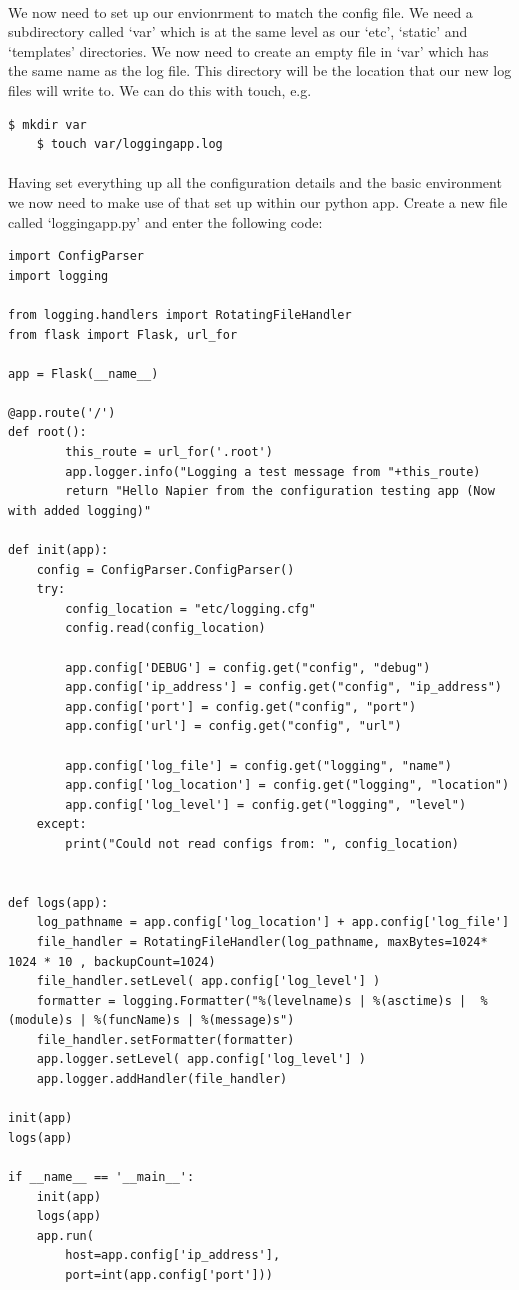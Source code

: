 \documentclass[12pt, a4paper, oneside]{book}
\begin{document}
\paragraph{} We now need to set up our envionrment to match the config file. We need a subdirectory called `var' which is at the same level as our `etc', `static' and `templates' directories. We now need to create an empty file in `var' which has the same name as the log file. This directory will be the location that our new log files will write to. We can do this with touch, e.g.

\begin{lstlisting}[style=DOS]
    $ mkdir var
    $ touch var/loggingapp.log
\end{lstlisting}

\paragraph{} Having set everything up all the configuration details and the basic environment we now need to make use of that set up within our python app. Create a new file called `loggingapp.py' and enter the following code:
\begin{lstlisting}
import ConfigParser
import logging

from logging.handlers import RotatingFileHandler
from flask import Flask, url_for

app = Flask(__name__)

@app.route('/')
def root():
        this_route = url_for('.root')
        app.logger.info("Logging a test message from "+this_route)
        return "Hello Napier from the configuration testing app (Now with added logging)" 

def init(app):
    config = ConfigParser.ConfigParser()
    try:
        config_location = "etc/logging.cfg"
        config.read(config_location)
        
        app.config['DEBUG'] = config.get("config", "debug")
        app.config['ip_address'] = config.get("config", "ip_address")
        app.config['port'] = config.get("config", "port")
        app.config['url'] = config.get("config", "url")

        app.config['log_file'] = config.get("logging", "name")
        app.config['log_location'] = config.get("logging", "location")
        app.config['log_level'] = config.get("logging", "level")
    except:
        print("Could not read configs from: ", config_location)


def logs(app):
    log_pathname = app.config['log_location'] + app.config['log_file']
    file_handler = RotatingFileHandler(log_pathname, maxBytes=1024* 1024 * 10 , backupCount=1024)
    file_handler.setLevel( app.config['log_level'] )
    formatter = logging.Formatter("%(levelname)s | %(asctime)s |  %(module)s | %(funcName)s | %(message)s")
    file_handler.setFormatter(formatter)
    app.logger.setLevel( app.config['log_level'] )
    app.logger.addHandler(file_handler)

init(app)
logs(app)

if __name__ == '__main__':
    init(app)
    logs(app)
    app.run(
        host=app.config['ip_address'], 
        port=int(app.config['port']))
\end{lstlisting}
\end{document}

